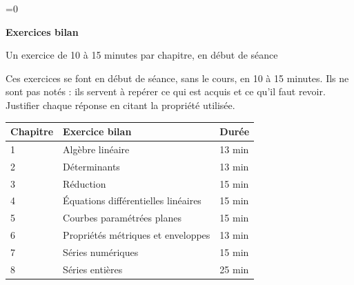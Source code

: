 \documentclass[a4paper,11pt]{article}
\newif\ifprof
\providecommand{\CHAP}{0}
\begin{document}
\ifnum\CHAP=0
\thispagestyle{empty}
\noindent\colorbox{Bleu}{\parbox{\dimexpr\linewidth-2\fboxsep}{\vspace{0.6em}
{\color{white}\sffamily\scriptsize{}}\par\smallskip
{\color{white}\sffamily\bfseries\LARGE Exercices bilan}\par\smallskip
{\color{white!85!Bleu}\sffamily Un exercice de 10 à 15 minutes par chapitre, en début de séance\ifprof\ --- version professeur\fi}\vspace{0.6em}}}
\vspace{1em}

\ifprof
Chaque exercice reprend les notions essentielles d'un chapitre, du plus simple (connaissance du cours) au plus appliqué.
Pour chaque chapitre : l'énoncé (une page, à donner tel quel), le corrigé détaillé, puis une grille qui associe à chaque question
les notions testées et la lacune que révèle une erreur. Les notations et les numéros de propriétés sont ceux des livrets.
Aucune notion hors programme n'est exigée ; la formule $\gamma=\det(f',f'')/\|f'\|^3$ n'apparaît dans le corrigé du chapitre~6
que comme contrôle facultatif.

\medskip
\textsf{\bfseries\color{Bleu}Conseils d'utilisation}
\begin{itemize}
\item Laisser l'élève travailler sans le cours ; noter le temps passé sur chaque question : une question qui bloque plus de
      deux ou trois minutes est déjà un indice.
\item Corriger en lisant la colonne « Une erreur ici signale\dots{} » : elle dit quelle partie du cours reprendre.
\item Les questions de cours (V/F, énoncés) se corrigent oralement en une minute ; insister sur la justification.
\end{itemize}
\else
Ces exercices se font en début de séance, sans le cours, en 10 à 15 minutes. Ils ne sont pas notés : ils servent à repérer ce
qui est acquis et ce qu'il faut revoir. Justifier chaque réponse en citant la propriété utilisée.
\fi

\medskip
{\sffamily\small
\begin{tabular}{@{}l l l@{}}
\toprule
\textbf{Chapitre} & \textbf{Exercice bilan} & \textbf{Durée}\\\midrule
1 & Algèbre linéaire & 13 min\\
2 & Déterminants & 13 min\\
3 & Réduction & 15 min\\
4 & Équations différentielles linéaires & 15 min\\
5 & Courbes paramétrées planes & 15 min\\
6 & Propriétés métriques et enveloppes & 13 min\\
7 & Séries numériques & 15 min\\
8 & Séries entières & 25 min\\
\bottomrule
\end{tabular}}
\end{document}
